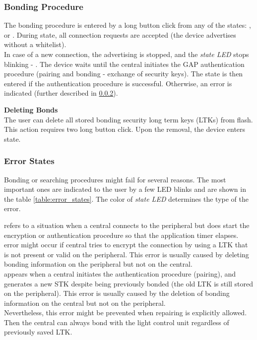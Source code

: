         \subsubsection{Bonding Procedure}
            \label{sec:bonding}
            The bonding procedure is entered by a long button click from any of the states:  ,   or .
            During \textbf{} \textbf{} state, all connection requests are accepted (the device advertises without a whitelist).\\
            In case of a new connection, the advertising is stopped, and the \textit{state LED} stops blinking - \textbf{}. The device waits until the central initiates the GAP authentication procedure (pairing and bonding - exchange of security keys). The  state is then entered if the authentication procedure is successful. Otherwise, an error is indicated (further described in \ref{sec:error_states}).
            
            \newpage 
            
            \textbf{Deleting Bonds}\\
            The user can delete all stored bonding security long term keys (LTKs) from flash. This action requires two long button click. Upon the removal, the device enters   state. 
            
        
        \subsubsection{Error States}
            \label{sec:error_states}
            Bonding or searching procedures might fail for several reasons. The most important ones are indicated to the user by a few LED blinks and are shown in the table \ref{table:error_states}. The color of \textit{state LED} determines the type of the error.
            
            \noindent\textbf{} refers to a situation when a central connects to the peripheral but does start the encryption or authentication procedure so that the application timer elapses.\\
            \textbf{} error might occur if central tries to encrypt the connection by using a LTK that is not present or valid on the peripheral. This error is usually caused by deleting bonding information on the peripheral but not on the central.\\
            \textbf{} appears when a central initiates the authentication procedure (pairing), and generates a new STK despite being previously bonded (the old LTK is still stored on the peripheral). This error is usually caused by the deletion of bonding information on the central but not on the peripheral.\\
            Nevertheless, this error might be prevented when repairing is explicitly allowed. Then the central can always bond with the light control unit regardless of previously saved LTK.
            
